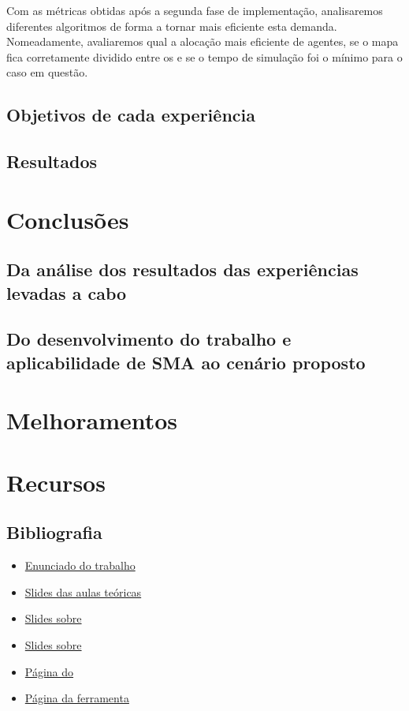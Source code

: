 \documentclass[12pt]{report}
\begin{document}
Com as métricas obtidas após a segunda fase de implementação, analisaremos diferentes algoritmos de forma a tornar mais eficiente esta demanda. Nomeadamente, avaliaremos qual a alocação mais eficiente de agentes, se o mapa fica corretamente dividido entre os \spotters e se o tempo de simulação foi o mínimo para o caso em questão.

\section{Objetivos de cada experiência}

\section{Resultados}

\chapter{Conclusões}

\section{Da análise dos resultados das experiências levadas a cabo}

\section{Do desenvolvimento do trabalho e aplicabilidade de SMA ao cenário proposto}

\chapter{Melhoramentos}



\chapter{Recursos}

\section{Bibliografia}

\begin{itemize}
	\item \href{https://paginas.fe.up.pt/~eol/AIAD/1617/trabalhos.html#T05}{Enunciado do trabalho}
	\item \href{https://paginas.fe.up.pt/~eol/AIAD/aiad1617.html}{Slides das aulas teóricas}
	\item \href{https://paginas.fe.up.pt/~eol/AIAD/aulas/jade_en.pdf}{Slides sobre \jade}
	\item \href{https://paginas.fe.up.pt/~eol/AIAD/aulas/REPAST_intro_hlc.pdf}{Slides sobre \repast}
	\item \href{https://web.fe.up.pt/~hlc/doku.php?id=sajas}{Página do \sajas}
	\item \href{https://web.fe.up.pt/~hlc/doku.php?id=massim2dev}{Página da ferramenta \massim}
\end{itemize}
\end{document}
